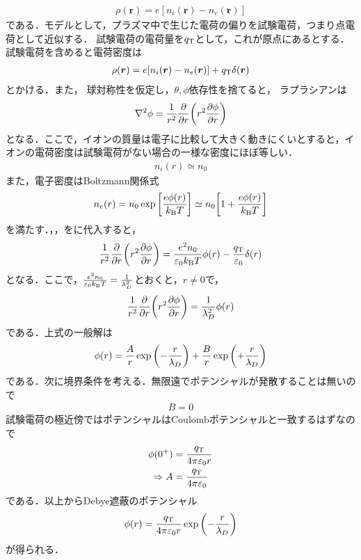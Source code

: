 \documentclass{report}
\begin{document}
    \begin{align}
      \rho(\bm{r}) = e[n_i(\bm{r}) - n_e(\bm{r})]
    \end{align}
    である．モデルとして，プラズマ中で生じた電荷の偏りを試験電荷，つまり点電荷として近似する．
    試験電荷の電荷量を$q_{\mathrm{T}}$として，これが原点にあるとする．
    試験電荷を含めると電荷密度は
    \begin{align}
      \rho(\bm{r}) = e[n_i(\bm{r}) - n_e(\bm{r})] + q_{\mathrm{T}}\delta(\bm{r}) \label{density-charge}
    \end{align}
    とかける．また，
    球対称性を仮定し，$\theta,\phi$依存性を捨てると，
    ラプラシアンは
    \begin{align}
      \nabla^2\phi = \frac{1}{r^2}\pdv{r} \qty(r^2 \pdv{\phi}{r})
    \end{align}
    となる．ここで，イオンの質量は電子に比較して大きく動きにくいとすると，イオンの電荷密度は試験電荷がない場合の一様な密度にほぼ等しい．
    \begin{align}
      n_i(r) \simeq n_0 \label{density-ion}
    \end{align}
    また，電子密度はBoltzmann関係式
    \begin{align}
      n_e(r) = n_0\exp\qty[\frac{e\phi(r)}{k_{\mathrm{B}} T}] \simeq n_0\qty[1 + \frac{e\phi(r)}{k_{\mathrm{B}} T}] \label{density-e}
    \end{align}
    を満たす．，，をに代入すると，
    \begin{align}
      \frac{1}{r^2}\pdv{r}\qty(r^2\pdv{\phi}{r}) = \frac{e^2 n_0}{\varepsilon_0 k_{\mathrm{B}} T}\phi(r) - \frac{q_{\mathrm{T}}}{\varepsilon_0}\delta(r)
    \end{align}
    となる．ここで，$\frac{e^2 n_0}{\varepsilon_0 k_{\mathrm{B}} T} = \frac{1}{\lambda_D^2}$とおくと，$r \neq 0$で，
    \begin{align}
      \frac{1}{r^2}\pdv{r}\qty(r^2\pdv{\phi}{r}) = \frac{1}{\lambda_D^2}\phi(r)
    \end{align}
    である．上式の一般解は
    \begin{align}
      \phi(r) = \frac{A}{r}\exp\qty(-\frac{r}{\lambda_D}) + \frac{B}{r}\exp\qty(+\frac{r}{\lambda_D})
    \end{align}
    である．次に境界条件を考える．無限遠でポテンシャルが発散することは無いので
    \begin{align}
      B = 0
    \end{align}
    試験電荷の極近傍ではポテンシャルはCoulombポテンシャルと一致するはずなので
    \begin{align}
      \phi(0^{+}) &= \frac{q_{\mathrm{T}}}{4\pi\varepsilon_0 r}\\
      \Rightarrow A&= \frac{q_{\mathrm{T}}}{4\pi\varepsilon_0}
    \end{align}
    である．以上からDebye遮蔽のポテンシャル
    \begin{align}
      \phi(r) = \frac{q_{\mathrm{T}}}{4\pi\varepsilon_0 r}\exp\qty(-\frac{r}{\lambda_D})
    \end{align}
    が得られる．
\end{document}

